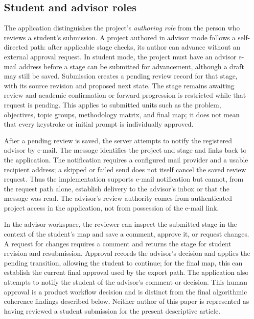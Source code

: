 \subsection{Student and advisor roles}

The application distinguishes the project's \emph{authoring role} from the person who reviews a student's submission. A project authored in advisor mode follows a self-directed path: after applicable stage checks, its author can advance without an external approval request. In student mode, the project must have an advisor e-mail address before a stage can be submitted for advancement, although a draft may still be saved. Submission creates a pending review record for that stage, with its source revision and proposed next state. The stage remains awaiting review and academic confirmation or forward progression is restricted while that request is pending. This applies to submitted units such as the problem, objectives, topic groups, methodology matrix, and final map; it does not mean that every keystroke or initial prompt is individually approved.

After a pending review is saved, the server attempts to notify the registered advisor by e-mail. The message identifies the project and stage and links back to the application. The notification requires a configured mail provider and a usable recipient address; a skipped or failed send does not itself cancel the saved review request. Thus the implementation supports e-mail notification but cannot, from the request path alone, establish delivery to the advisor's inbox or that the message was read. The advisor's review authority comes from authenticated project access in the application, not from possession of the e-mail link.

In the advisor workspace, the reviewer can inspect the submitted stage in the context of the student's map and save a comment, approve it, or request changes. A request for changes requires a comment and returns the stage for student revision and resubmission. Approval records the advisor's decision and applies the pending transition, allowing the student to continue; for the final map, this can establish the current final approval used by the export path. The application also attempts to notify the student of the advisor's comment or decision. This human approval is a product workflow decision and is distinct from the final algorithmic coherence findings described below. Neither author of this paper is represented as having reviewed a student submission for the present descriptive article.

